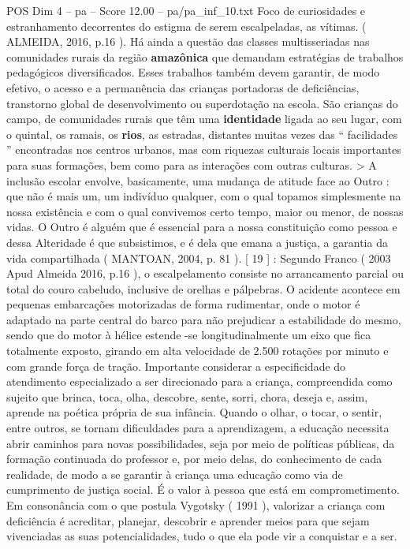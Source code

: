 \begin{textsample}{POS Dim 4 – pa – Score 12.00 – pa/pa\_inf\_10.txt}
Foco de curiosidades e estranhamento decorrentes do estigma de serem escalpeladas, as vítimas. ( ALMEIDA, 2016, p.16 ).
Há ainda a questão das classes multisseriadas nas comunidades rurais da região \textbf{amazônica} que demandam estratégias de trabalhos pedagógicos diversificados.
Esses trabalhos também devem garantir, de modo efetivo, o acesso e a permanência das crianças portadoras de deficiências, transtorno global de desenvolvimento ou superdotação na escola.
São crianças do campo, de comunidades rurais que têm uma \textbf{identidade} ligada ao seu lugar, com o quintal, os ramais, os \textbf{rios}, as estradas, distantes muitas vezes das “ facilidades ” encontradas nos centros urbanos, mas com riquezas culturais locais importantes para suas formações, bem como para as interações com outras culturas. > A inclusão escolar envolve, basicamente, uma mudança de atitude face ao Outro : que não é mais um, um indivíduo qualquer, com o qual topamos simplesmente na nossa existência e com o qual convivemos certo tempo, maior ou menor, de nossas vidas.
O Outro é alguém que é essencial para a nossa constituição como pessoa e dessa Alteridade é que subsistimos, e é dela que emana a justiça, a garantia da vida compartilhada ( MANTOAN, 2004, p. 81 ). [ 19 ] : Segundo Franco ( 2003 Apud Almeida 2016, p.16 ), o escalpelamento consiste no arrancamento parcial ou total do couro cabeludo, inclusive de orelhas e pálpebras.
O acidente acontece em pequenas embarcações motorizadas de forma rudimentar, onde o motor é adaptado na parte central do barco para não prejudicar a estabilidade do mesmo, sendo que do motor à hélice estende -se longitudinalmente um eixo que fica totalmente exposto, girando em alta velocidade de 2.500 rotações por minuto e com grande força de tração.
Importante considerar a especificidade do atendimento especializado a ser direcionado para a criança, compreendida como sujeito que brinca, toca, olha, descobre, sente, sorri, chora, deseja e, assim, aprende na poética própria de sua infância.
Quando o olhar, o tocar, o sentir, entre outros, se tornam dificuldades para a aprendizagem, a educação necessita abrir caminhos para novas possibilidades, seja por meio de políticas públicas, da formação continuada do professor e, por meio delas, do conhecimento de cada realidade, de modo a se garantir à criança uma educação como via de cumprimento de justiça social.
É o valor à pessoa que está em comprometimento.
Em consonância com o que postula Vygotsky ( 1991 ), valorizar a criança com deficiência é acreditar, planejar, descobrir e aprender meios para que sejam vivenciadas as suas potencialidades, tudo o que ela pode vir a conquistar e a ser.

\end{textsample}
